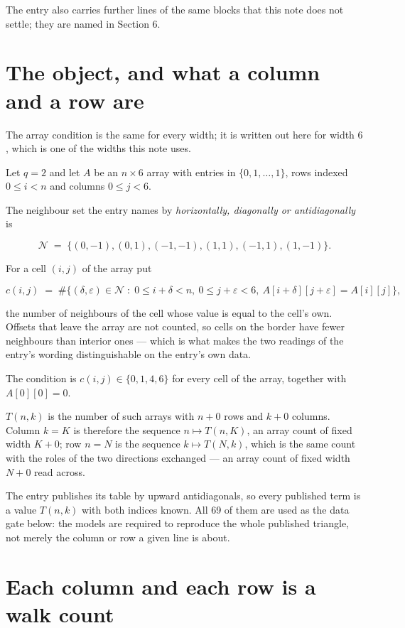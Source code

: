 \documentclass[11pt]{article}
\theoremstyle{definition}
\begin{document}
The entry also carries further lines of the same blocks that this note does not settle; they are named in Section 6.

\section{The object, and what a column and a row are}

The array condition is the same for every width; it is written out here for width $6$, which is one of the widths this note uses.

Let $q = 2$ and let $A$ be an $n \times 6$ array with entries in $\{0,1,\dots,1\}$, rows indexed $0 \le i < n$ and columns $0 \le j < 6$.

The neighbour set the entry names by {\itshape horizontally, diagonally or antidiagonally} is

\[\mathcal{N} \;=\; \{(0,-1), (0,1), (-1,-1), (1,1), (-1,1), (1,-1)\}.\]

For a cell $(i,j)$ of the array put

\[c(i,j) \;=\; \#\bigl\{(\delta,\varepsilon)\in\mathcal{N} \;:\; 0\le i+\delta<n,\ 0\le j+\varepsilon<6,\ A[i+\delta][j+\varepsilon] = A[i][j]\bigr\},\]

the number of neighbours of the cell whose value is equal to the cell's own. Offsets that leave the array are not counted, so cells on the border have fewer neighbours than interior ones --- which is what makes the two readings of the entry's wording distinguishable on the entry's own data.

The condition is $c(i,j) \in \{0, 1, 4, 6\}$ for every cell of the array, together with $A[0][0]=0$.

$T(n,k)$ is the number of such arrays with $n + 0$ rows and $k + 0$ columns. Column $k = K$ is therefore the sequence $n \mapsto T(n,K)$, an array count of fixed width $K + 0$; row $n = N$ is the sequence $k \mapsto T(N,k)$, which is the same count with the roles of the two directions exchanged --- an array count of fixed width $N + 0$ read across.

The entry publishes its table by upward antidiagonals, so every published term is a value $T(n,k)$ with both indices known. All 69 of them are used as the data gate below: the models are required to reproduce the whole published triangle, not merely the column or row a given line is about.

\section{Each column and each row is a walk count}
\end{document}
